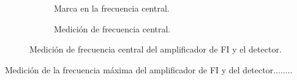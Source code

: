     \begin{figure}[H]
      \centering
      \begin{subfigure}[ht]{0.48\textwidth}
        \caption{Marca en la frecuencia central.}
        \label{fig:FrecuenciaCenFI_Osc}
      \end{subfigure}
      \hfill 
      \begin{subfigure}[ht]{0.48\textwidth}
        \caption{Medición de frecuencia central.}
        \label{fig:FrecuneciaCenFI_Gener}
      \end{subfigure}

      \caption{Medición de frecuencia central del amplificador de FI y el detector.}
      \label{fig:FrecuenciaCenFI}
    \end{figure}

    Medición de la frecuencia máxima del amplificador de FI y del detector........

